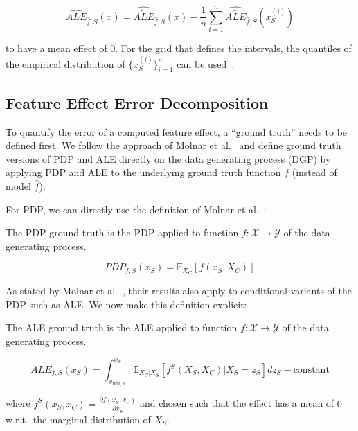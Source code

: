 \documentclass[runningheads]{llncs}
\begin{document}
\begin{equation}\label{eq:ale-estimate-centered}
    \widehat{ALE}_{\hat f, S}(x) =
    \widehat{\widetilde{ALE}}_{\hat f, S}(x)
    - \frac{1}{n} \sum_{i=1}^n \widehat{\widetilde{ALE}}_{\hat f, S}(x_S^{(i)})
\end{equation}

\noindent to have a mean effect of $0$. For the grid that defines the intervals,
the quantiles of the empirical distribution of $\{x^{(i)}_S\}_{i=1}^n$ can be  %
used~\cite{apley_visualizing_2020}.\\

\subsection{Feature Effect Error Decomposition}

To quantify the error of a computed feature effect, a ``ground truth'' needs to
be defined first. We follow the approach of Molnar et
al.~\cite{molnar_relating_2023} and define ground truth versions of PDP and ALE
directly on the data generating process (DGP) by applying PDP and ALE to the
underlying ground truth function $f$ (instead of model $\hat f$).

For PDP, we can directly use the definition of Molnar et
al.~\cite{molnar_relating_2023}:

\begin{definition}
    The PDP ground truth is the PDP applied to function
    $f : \mathcal{X} \xrightarrow{} \mathcal{Y}$
    of the data generating process.

    \begin{equation}
        PDP_{f,S}(x_S) = \mathbb{E}_{X_C}[f(x_S,X_C)]
    \end{equation}
\end{definition}

As stated by Molnar et al.~\cite{molnar_relating_2023}, their results also
apply to conditional variants of the PDP such as ALE. We now make this  %
definition explicit:

\begin{definition}
    The ALE ground truth is the ALE applied to function $f : \mathcal{X} \xrightarrow{} \mathcal{Y}$ of the data generating process.

    \begin{equation}
        ALE_{f,S}(x_S) = \int_{x_{\text{min},s}}^{x_S} \mathbb{E}_{X_C|X_S} \left[f^S(X_S, X_C)|X_S = z_S\right] dz_S - \text{constant}
    \end{equation}

    \noindent where $f^S(x_S, x_C) = \frac{\partial f(x_S, x_C)}{\partial x_S}$ and  chosen such that the effect has a mean of $0$ w.r.t.\ the marginal distribution of $X_S$.
\end{definition}
\end{document}
